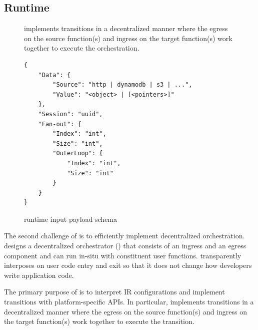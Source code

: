 \subsection{\name{} Runtime}\label{sec:runtime}

\begin{figure}[t!]
	\centering
	\caption{\deorc{} implements transitions in a decentralized manner where
the egress on the source function(s) and ingress on the target function(s)
work together to execute the orchestration. }
	\label{fig:transition}
\end{figure}

\begin{figure}[]
    \begin{verbatim}
{
    "Data": {
        "Source": "http | dynamodb | s3 | ...",
        "Value": "<object> | [<pointers>]"
    },
    "Session": "uuid",
    "Fan-out": {
        "Index": "int",
        "Size": "int",
        "OuterLoop": {
            "Index": "int",
            "Size": "int"
        }
    }
}
    \end{verbatim}
    \caption{\name{} runtime input payload schema}
    \label{fig:input-format}
\end{figure}

The second challenge of \name{} is to efficiently implement decentralized
orchestration. \name{} designs a decentralized orchestrator (\deorc) that
consists of an ingress and an egress component and can run in-situ with
constituent user functions. \deorc{} transparently interposes on user code
entry and exit so that it does not change how developers write application
code.

The primary purpose of \deorc{} is to interpret IR configurations and implement
transitions with platform-specific APIs. In particular, \deorc{} implements
transitions in a decentralized manner where the egress on the source
function(s) and ingress on the target function(s) work together to execute the
transition.

